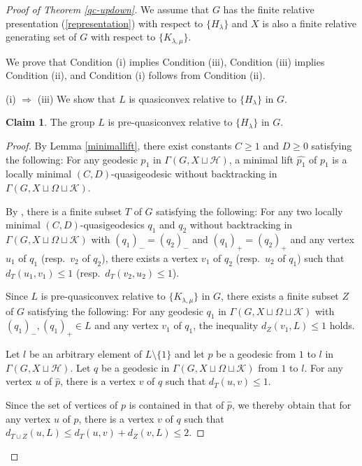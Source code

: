 \documentclass{amsart}
\theoremstyle{definition}
\newtheorem{Claim}[Thm]{Claim}
\begin{document}
\begin{proof}[Proof of Theorem \ref{qc-updown}]
We assume that $G$ has the finite relative presentation (\ref{representation}) with respect to $\{H_\lambda\}$ and $X$ is also a finite relative generating set of $G$ with respect to $\{K_{\lambda,\mu}\}$. 

We prove that Condition (i) implies Condition (iii), Condition (iii) implies Condition (ii), and Condition (i) follows from Condition (ii). 

(i) $\Rightarrow$ (iii) 
We show that $L$ is quasiconvex relative to $\{H_\lambda\}$ in $G$. 

\begin{Claim}\label{claim1}
The group $L$ is pre-quasiconvex relative to $\{H_\lambda\}$ in $G$. 
\end{Claim}

\begin{proof}
By Lemma \ref{minimallift}, there exist constants $C\geq 1$ and $D\geq 0$ satisfying the following:
For any geodesic $p_1$ in $\Gamma(G,X\sqcup{\mathcal H})$, a minimal lift $\widehat{p_1}$ of $p_1$ is a locally minimal $(C,D)$-quasigeodesic without backtracking in $\Gamma(G,X\sqcup\Omega\sqcup{\mathcal K})$. 

By \cite[Theorem 2.14]{MP08}, there is a finite subset $T$ of $G$ satisfying the following: 
For any two locally minimal $(C,D)$-quasigeodesics $q_1$ and $q_2$ without backtracking in $\Gamma(G,X\sqcup \Omega\sqcup{\mathcal K})$ with $(q_1)_-=(q_2)_-$ and $(q_1)_+=(q_2)_+$ and any vertex $u_1$ of $q_1$ (resp.\ $v_2$ of $q_2$), there exists a vertex $v_1$ of $q_2$ (resp.\ $u_2$ of $q_1$) such that $d_T(u_1,v_1)\leq 1$ (resp.\ $d_T(v_2,u_2)\leq 1$). 

Since $L$ is pre-quasiconvex relative to $\{K_{\lambda,\mu}\}$ in $G$, there exists a finite subset $Z$ of $G$ satisfying the following:
For any geodesic $q_1$ in $\Gamma(G,X\sqcup\Omega\sqcup{\mathcal K})$ with $(q_1)_-,(q_1)_+\in L$ and any vertex $v_1$ of $q_1$, the inequality $d_Z(v_1,L)\leq 1$ holds. 

Let $l$ be an arbitrary element of $L\setminus \{1\}$ and let $p$ be a geodesic from $1$ to $l$ in $\Gamma(G,X\sqcup{\mathcal H})$. 
Let $q$ be a geodesic in $\Gamma(G,X\sqcup\Omega\sqcup{\mathcal K})$ from $1$ to $l$. 
For any vertex $u$ of $\widehat{p}$, there is a vertex $v$ of $q$ such that $d_T(u,v)\leq 1$. 

Since the set of vertices of $p$ is contained in that of $\widehat{p}$, we thereby obtain that for any vertex $u$ of $p$, there is a vertex $v$ of $q$ such that $d_{T\cup Z}(u,L)\leq d_T(u,v)+d_Z(v,L)\leq 2$. 
\end{proof}


\end{proof}
\end{document}
